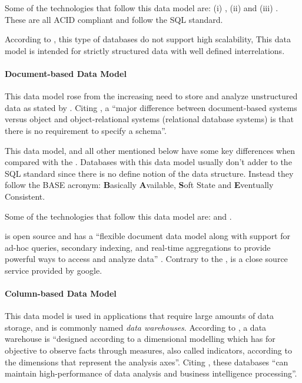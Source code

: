 Some of the technologies that follow this data model are: (i) , (ii)  and (iii) .
These are all ACID compliant and follow the SQL standard.

According to \cite{jatana2012survey}, this type of databases do not support high scalability, 
This data model is intended for strictly structured data with well defined interrelations.

\paragraph{Document-based Data Model}
\label{par:stateofart:arch:infra:store:nosql}

This data model rose from the increasing need to store and analyze unstructured data as stated by \cite{miloslavskaya2016big}.  Citing \cite{elmasri2000fundamentals}, a ``major difference between document-based systems versus object and object-relational systems (relational database systems) is that there is no requirement to specify a schema''.

This data model, and all other mentioned below have some key differences when compared with the .
Databases with this data model usually don't adder to the \gls{SQL} standard since there is no define notion of the data structure. Instead they follow the BASE acronym: \textbf{B}asically \textbf{A}vailable, \textbf{S}oft State and \textbf{E}ventually Consistent.

Some of the technologies that follow this data model are:  and .

 is open source and has a ``flexible document data model along with support for ad-hoc queries, secondary indexing, and real-time aggregations to provide powerful ways to access and analyze data'' \parencite{mongodb}.
Contrary to the ,  is a close source service provided by google.

\paragraph{Column-based Data Model}
\label{par:stateofart:arch:infra:store:time}

This data model is used in applications that require large amounts of data storage, and is commonly named \textit{data warehouses}. According to \cite{dehdouh2015using}, a data warehouse  is ``designed according to a dimensional modelling which has for objective to observe facts through measures, also called indicators, according to the dimensions that represent the analysis axes''. Citing \cite{han2011survey}, these databases ``can maintain high-performance of data analysis and business intelligence processing''.

